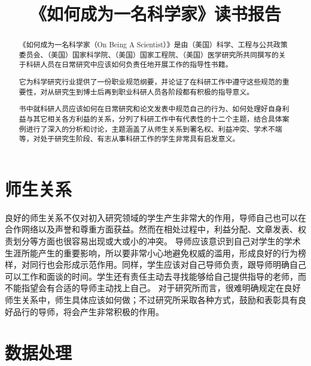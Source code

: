 \documentclass[conference]{IEEEtran}
\begin{document}
	
\pagestyle{mystyle}

\title{《如何成为一名科学家》读书报告}

\author{
}

\maketitle

\begin{abstract}
《如何成为一名科学家（On Being A Scientist）》\cite{a1989being}是由（美国）科学、工程与公共政策委员会、（美国）国家科学院、（美国）国家工程院、（美国）医学研究所共同撰写的关于科研人员在日常研究中应该如何负责任地开展工作的指导性书籍。

它为科学研究行业提供了一份职业规范纲要，并论证了在科研工作中遵守这些规范的重要性，对从研究生到博士后再到职业科研人员各阶段都有积极的指导意义。

书中就科研人员应该如何在日常研究和论文发表中规范自己的行为、如何处理好自身利益与其它相关各方利益的关系，分列了科研工作中有代表性的十二个主题，结合具体案例进行了深入的分析和讨论，主题涵盖了从师生关系到署名权、利益冲突、学术不端等，对处于研究生阶段、有志从事科研工作的学生非常具有启发意义。
\end{abstract}


\section{师生关系}

良好的师生关系不仅对初入研究领域的学生产生非常大的作用，导师自己也可以在合作网络以及声誉和尊重方面获益。然而在相处过程中，利益分配、文章发表、权责划分等方面也很容易出现或大或小的冲突。
导师应该意识到自己对学生的学术生涯所能产生的重要影响，所以要非常小心地避免权威的滥用，形成良好的行为榜样，对同行也会形成示范作用。同样，学生应该对自己导师负责，跟导师明确自己可以工作和面谈的时间。学生还有责任主动去寻找能够给自己提供指导的老师，而不能指望会有合适的导师主动找上自己。
对于研究所而言，很难明确规定在良好师生关系中，师生具体应该如何做；不过研究所采取各种方式，鼓励和表彰具有良好品行的导师，将会产生非常积极的作用。


\section{数据处理}
\end{document}

